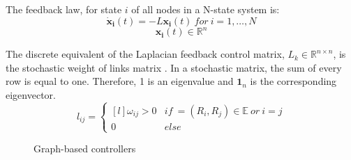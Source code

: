 \documentclass[a4paper, 12pt]{report}
\begin{document}
The feedback law, for state $i$ of all nodes in a N-state system is:
\[ \boldsymbol{\dot x_i}(t) = - L\boldsymbol{x_i}(t)\ for\ i=1, \ldots, N \]
\[\boldsymbol{x_i}(t) \in \mathbb{R}^n\]

The discrete equivalent of the Laplacian feedback control matrix, $L_k \in \mathbb{R}^{n \times n}$, is the stochastic weight of links matrix \cite{Moreau2005}. In a stochastic matrix, the sum of every row is equal to one. Therefore, 1 is an eigenvalue and $\boldsymbol{1}_n$ is the corresponding eigenvector.
\[l_{ij} =  \left\{ \begin{matrix*}[l] \omega_{ij} > 0 & if\  = (R_i, R_j) \in \mathbb{E}\ or\ i=j\\ 0 & else \end{matrix*} \right.\]

\begin{figure}[htbp]
\centering
{}
\caption{Graph-based controllers}
\label{fig:laplacianCont}
\end{figure}
\end{document}
